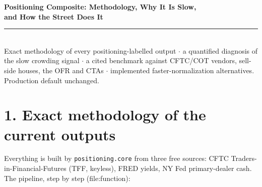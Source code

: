 \documentclass[10pt,a4paper]{article}
\newcommand{\sect}[1]{\section*{\color{bigorange}#1}}
\newcommand{\code}[1]{\texttt{\small #1}}
\begin{document}
\begin{center}
{\LARGE\textbf{\color{biggrey}Positioning Composite: Methodology, Why It Is Slow,\\ and How the Street Does It}}\\[3pt]
{\color{bigorange}\rule{\textwidth}{2.5pt}}\\[3pt]
{\small Exact methodology of every positioning-labelled output $\cdot$ a quantified diagnosis of the
slow crowding signal $\cdot$ a cited benchmark against CFTC/COT vendors, sell-side houses, the OFR and
CTAs $\cdot$ implemented faster-normalization alternatives. Production default unchanged.}
\end{center}

\sect{1. Exact methodology of the current outputs}
Everything is built by \code{positioning.core} from three free sources: CFTC Traders-in-Financial-Futures
(TFF, keyless), FRED yields, NY Fed primary-dealer cash. The pipeline, step by step (file:function):
\end{document}
